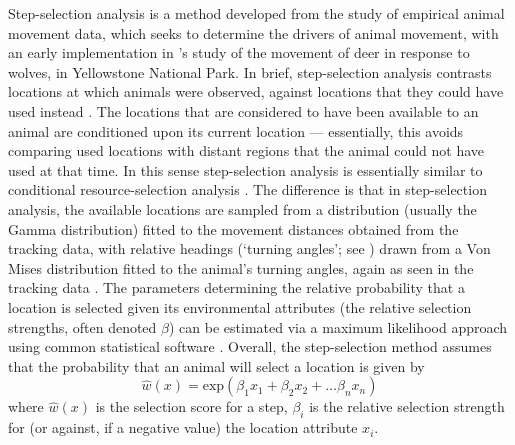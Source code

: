 \medskip

\begin{tcolorbox}[width=\textwidth,
    boxsep=0pt,
    left=0pt,
    right=0pt,
    top=2pt,
    arc=0pt,
    boxrule=0.0pt,
    toprule=1pt,
    bottomrule=1pt,
    colback=white
    ]%
    \begin{description}[font=\scshape\bfseries]
        \item[Box A. Step-selection Analysis: An Introduction] Step-selection analysis is a method developed from the study of empirical animal movement data, which seeks to determine the drivers of animal movement, with an early implementation in \textcite{fortin2005}'s study of the movement of deer in response to wolves, in Yellowstone National Park.
        In brief, step-selection analysis contrasts locations at which animals were observed, against locations that they could have used instead \parencite[][]{fortin2005}.
        The locations that are considered to have been available to an animal are conditioned upon its current location --- essentially, this avoids comparing used locations with distant regions that the animal could not have used at that time.
        In this sense step-selection analysis is essentially similar to conditional resource-selection analysis \parencite[see as general reference][]{manly2007}.
        The difference is that in step-selection analysis, the available locations are sampled from a distribution (usually the Gamma distribution) fitted to the movement distances obtained from the tracking data, with relative headings (`turning angles'; see \cite{calenge2009}) drawn from a Von Mises distribution fitted to the animal's turning angles, again as seen in the tracking data \parencite[][]{thurfjell2014,signer2019}.
        The parameters determining the relative probability that a location is selected given its environmental attributes (the relative selection strengths, often denoted $\beta$) can be estimated via a maximum likelihood approach using common statistical software \parencite[see e.g. for R][]{therneau2000}.
        Overall, the step-selection method assumes that the probability that an animal will select a location is given by
        $$
            \hat{w}(x) = \text{exp}(\beta_1x_1 + \beta_2x_2 + \ldots \beta_nx_n)
        $$
        where $\hat{w}(x)$ is the selection score for a step, $\beta_i$ is the relative selection strength for (or against, if a negative value) the location attribute $x_i$.
    \end{description}
\end{tcolorbox}

